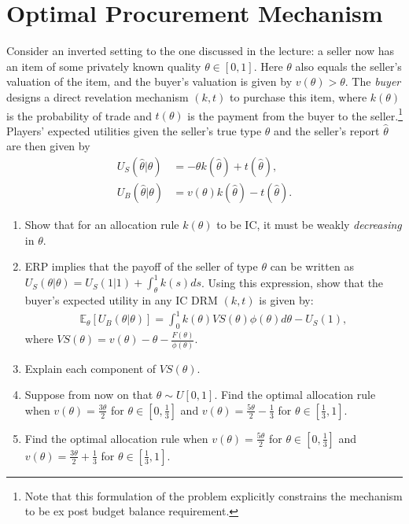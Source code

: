 \documentclass[a4paper]{article}
\begin{document}
\section{Optimal Procurement Mechanism}
	Consider an inverted setting to the one discussed in the lecture: a seller now has an item of some privately known quality $\theta \in [0,1]$. Here $\theta$ also equals the seller's valuation of the item, and the buyer's valuation is given by $v(\theta) > \theta$. The \emph{buyer} designs a direct revelation mechanism $(k,t)$ to purchase this item, where $k(\theta)$ is the probability of trade and $t(\theta)$ is the payment from the buyer to the seller.\footnote{Note that this formulation of the problem explicitly constrains the mechanism to be ex post budget balance requirement.} Players' expected utilities given the seller's true type $\theta$ and the seller's report $\hat{\theta}$ are then given by
	\begin{align*}
		U_S(\hat{\theta}|\theta) &= -\theta k(\hat{\theta}) + t(\hat{\theta}),
		\\
		U_B(\hat{\theta}|\theta) &= v(\theta) k(\hat{\theta}) - t(\hat{\theta}).
	\end{align*}
	\begin{enumerate}
		\item Show that for an allocation rule $k(\theta)$ to be IC, it must be weakly \emph{decreasing} in $\theta$.
		\item ERP implies that the payoff of the seller of type $\theta$ can be written as $U_S(\theta|\theta) = U_S(1|1) + \int_{\theta}^{1} k(s) ds $. Using this expression, show that the buyer's expected utility in any IC DRM $(k,t)$ is given by:
		\begin{align*}
			\mathbb{E}_\theta [ U_B(\theta | \theta) ] = \int_0^1 k(\theta) VS(\theta) \phi(\theta) d\theta - U_S(1),
		\end{align*}
		where $VS(\theta) = v(\theta) - \theta - \frac{F(\theta)}{\phi(\theta)}$.
		\item Explain each component of $VS(\theta)$.
		\item Suppose from now on that $\theta \sim U[0,1]$. Find the optimal allocation rule when $v(\theta) = \frac{3\theta}{2}$ for $\theta \in [0,\frac{1}{3}]$ and $v(\theta) = \frac{5\theta}{2}-\frac{1}{3}$ for $\theta \in [\frac{1}{3},1]$.
		\item Find the optimal allocation rule when $v(\theta) = \frac{5\theta}{2}$ for $\theta \in [0,\frac{1}{3}]$ and $v(\theta) = \frac{3\theta}{2}+\frac{1}{3}$ for $\theta \in [\frac{1}{3},1]$.
	\end{enumerate}
		
\end{document}
